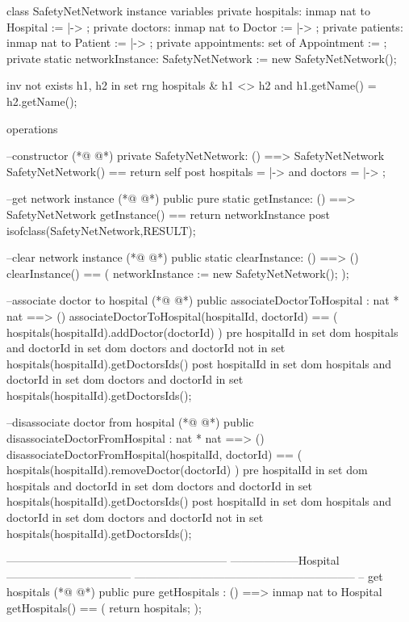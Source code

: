 \begin{vdmpp}[breaklines=true]
class SafetyNetNetwork 
instance variables
  private hospitals: inmap nat to Hospital := { |-> };
  private doctors: inmap nat to Doctor := { |-> };
  private patients: inmap nat to Patient := { |-> };
  private appointments: set of Appointment := {};
  private static networkInstance: SafetyNetNetwork := new SafetyNetNetwork();
  
  inv not exists h1, h2 in set rng hospitals &
  h1 <> h2 and h1.getName() = h2.getName();

operations

  --constructor
(*@
\label{SafetyNetNetwork:15}
@*)
  private SafetyNetNetwork: () ==> SafetyNetNetwork
  SafetyNetNetwork() == return self
  post hospitals = { |-> } and  doctors = { |-> };

  --get network instance
(*@
\label{getInstance:20}
@*)
  public pure static getInstance: () ==> SafetyNetNetwork
  getInstance() == return networkInstance
  post isofclass(SafetyNetNetwork,RESULT);

  
  --clear network instance
(*@
\label{clearInstance:26}
@*)
  public static clearInstance: () ==> ()
  clearInstance() == (
   networkInstance := new SafetyNetNetwork(); 
  );
  
  --associate doctor to hospital
(*@
\label{associateDoctorToHospital:32}
@*)
  public associateDoctorToHospital : nat * nat ==> ()
   associateDoctorToHospital(hospitalId, doctorId) == (
    hospitals(hospitalId).addDoctor(doctorId)
  )
  pre hospitalId in set dom hospitals and doctorId in set dom doctors and doctorId not in set hospitals(hospitalId).getDoctorsIds()
   post hospitalId in set dom hospitals and doctorId in set dom doctors and doctorId in set hospitals(hospitalId).getDoctorsIds();
    
  
  --disassociate doctor from hospital
(*@
\label{disassociateDoctorFromHospital:41}
@*)
  public disassociateDoctorFromHospital : nat * nat ==> ()
   disassociateDoctorFromHospital(hospitalId, doctorId) == (
    hospitals(hospitalId).removeDoctor(doctorId)
  )
  pre hospitalId in set dom hospitals and doctorId in set dom doctors and doctorId in set hospitals(hospitalId).getDoctorsIds()
  post hospitalId in set dom hospitals and doctorId in set dom doctors and doctorId not in set hospitals(hospitalId).getDoctorsIds();
    
  -----------------------------------------------------------
  ------------------Hospital---------------------------------
  -----------------------------------------------------------
   -- get hospitals
(*@
\label{getHospitals:52}
@*)
  public pure getHospitals : () ==> inmap nat to Hospital
  getHospitals() == (
   return hospitals;
  );
    

\end{vdmpp}
